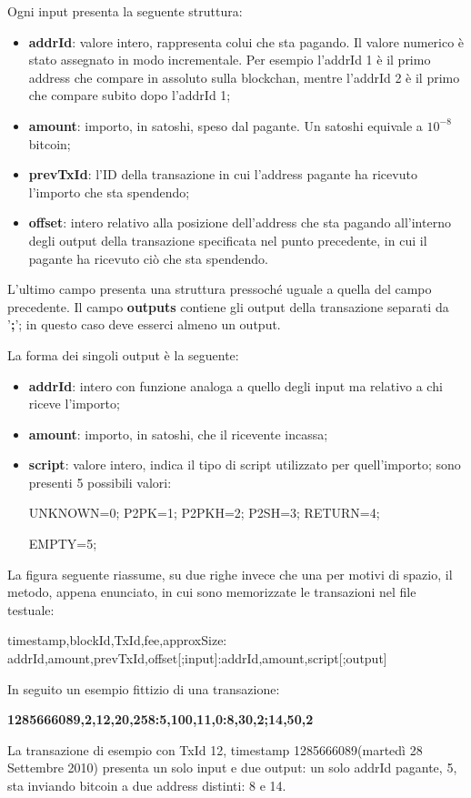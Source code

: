 Ogni input presenta la seguente struttura:
\begin{itemize}
    \item \textbf{addrId}: valore intero, rappresenta colui che sta pagando. Il valore numerico è stato assegnato in modo incrementale.
    Per esempio l'addrId 1 è il primo address che compare in assoluto sulla blockchan, mentre l'addrId 2 è il primo che compare subito dopo l'addrId 1;
    \item \textbf{amount}: importo, in satoshi, speso dal pagante. Un satoshi equivale a $10^{-8}$ bitcoin; 
    \item \textbf{prevTxId}: l'ID della transazione in cui l’address pagante ha ricevuto l’importo che sta spendendo;
    \item \textbf{offset}: intero relativo alla posizione dell’address che sta pagando all’interno degli output della transazione specificata nel punto precedente, in cui il pagante ha ricevuto ciò che sta spendendo.
\end{itemize}
L'ultimo campo presenta una struttura pressoché uguale a quella del campo precedente.
Il campo \textbf{outputs} contiene gli output della transazione separati da '\textbf{;}'; in questo caso deve esserci almeno un output.

La forma dei singoli output è la seguente:
\begin{itemize}
    \item \textbf{addrId}: intero con funzione analoga a quello degli input ma relativo a chi riceve l'importo; 
    \item \textbf{amount}: importo, in satoshi, che il ricevente incassa;
    \item \textbf{script}: valore intero, indica il tipo di script utilizzato per quell'importo; sono presenti 5 possibili valori: 
    
    UNKNOWN=0; P2PK=1; P2PKH=2; P2SH=3; RETURN=4;
    
    EMPTY=5;
\end{itemize}
La figura seguente riassume, su due righe invece che una per motivi di spazio, il metodo, appena enunciato, in cui sono memorizzate le transazioni nel file testuale:
\begin{mdframed}
timestamp,blockId,TxId,fee,approxSize:\\addrId,amount,prevTxId,offset[;input]:addrId,amount,script[;output]
\end{mdframed}
In seguito un esempio fittizio di una transazione:
\begin{center}
\textbf{1285666089,2,12,20,258:5,100,11,0:8,30,2;14,50,2}
\end{center}
La transazione di esempio con TxId 12, timestamp 1285666089(martedì 28 Settembre 2010) presenta un solo input e due output: un solo addrId pagante, 5, sta inviando bitcoin a due address distinti: 8 e 14.


